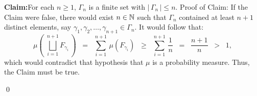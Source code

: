	\begin{center}
	\begin{minipage}{6.5in}
	\vskip 0.1cm
	\noindent
	\textbf{Claim:}\;\;For each $n \geq 1$, $\Gamma_{n}$ is a finite set with $\left\vert\,\Gamma_{n}\,\right\vert \leq n$.
	\vskip 0.2cm
	\noindent
	Proof of Claim:\quad
	If the Claim were false, there would exist $n \in \mathbb{N}$ such that $\Gamma_{n}$ contained at least $n+1$ distinct elements,
	say $\gamma_{1}, \gamma_{2}, \ldots, \gamma_{n+1} \in \Gamma_{n}$.
	It would follow that:
	\begin{equation*}
	\mu\!\left(\;\bigsqcup_{i=1}^{n+1} F_{\gamma_{i}}\,\right)
	\;\;=\;\; \sum_{i=1}^{n+1}\,\mu\!\left(F_{\gamma_{i}}\right)
	\;\;\geq\;\; \sum_{i=1}^{n+1}\,\dfrac{1}{n}
	\;\;=\;\;\dfrac{n+1}{n}
	\;\;>\;\; 1,
	\end{equation*}
	which would contradict that hypothesis that $\mu$ is a probability measure.
	Thus, the Claim must be true.
	\end{minipage}
	\end{center}
\qed

